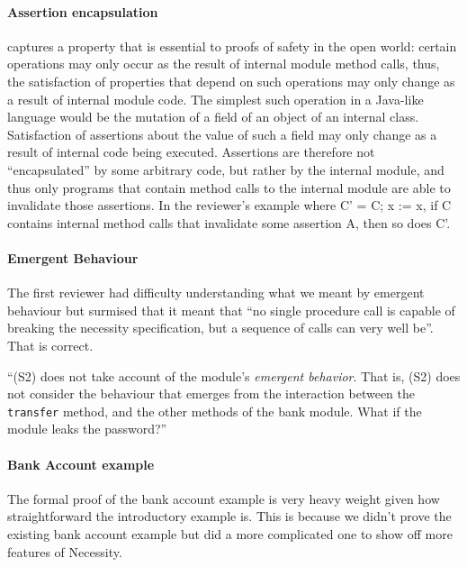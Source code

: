 \documentclass[11pt]{amsart}
\begin{document}
\paragraph{\textbf{Assertion encapsulation}} captures a property that is essential to proofs of safety in the open world: certain operations may only occur as the result of internal module method calls, thus, the satisfaction of properties that depend on such operations may only change as a result of internal module code. The simplest such operation in a Java-like language would be the mutation of a field of an object of an internal class. Satisfaction of assertions about the value of such a field may only change as a result of internal code being executed. Assertions are therefore not ``encapsulated'' by some arbitrary code, but rather by the internal module, and thus only programs that contain method calls to the internal module are able to invalidate those assertions. In the reviewer's example where C' = C; x := x, if C contains internal method calls that invalidate some assertion A, then so does C'.

\paragraph{Emergent Behaviour} 
The first reviewer had difficulty understanding what we meant by emergent behaviour but surmised that it meant that  ``no single procedure call is capable of breaking the necessity specification, but a sequence of calls can very well be''. That is correct.

``(S2) does not take account of the module's \emph{emergent behavior}. That is, (S2) does not consider the behaviour that emerges from the interaction between the 
\texttt{transfer} method, and the other methods of the bank module. What if the module leaks the password?''

\paragraph{Bank Account example} The formal proof of the bank account example is very heavy weight given how straightforward the introductory example is. This is because we didn't prove the existing bank account example but did a more complicated one to show off more features of Necessity.
\end{document}
